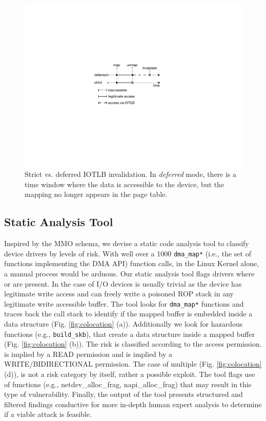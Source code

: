 \begin{figure}[t]
    \centering
    \includegraphics[width=1\columnwidth]{figs/strict.pdf}
    \caption{Strict vs. deferred IOTLB invalidation. In \emph{deferred} mode, there is a time window where the data is accessible to the device, but the mapping no longer appears in the page table.}
    \label{fig:deferred}
\end{figure}
\subsection{Static Analysis Tool}

Inspired by the MMO schema, we devise a static code analysis tool to classify device drivers by levels of risk. With well over a 1000 \texttt{dma\_map*} (i.e., the set of functions implementing the DMA API) function calls, in the Linux Kernel alone, a manual process would be arduous.
Our static analysis tool flags drivers where \means{} or \oportunity{} are present. In the case of I/O devices \motivation{} is usually trivial as the device has legitimate write access and can freely write a poisoned ROP stack in any legitimate write accessible buffer. The tool looks for \texttt{dma\_map*} functions and traces back the call stack to identify if the mapped buffer is embedded inside a data structure (Fig. \ref{fig:colocation} (a)). Additionally we look for hazardous functions (e.g., \texttt{build\_skb}), that create a data structure inside a mapped buffer (Fig. \ref{fig:colocation} (b)). The risk is classified according to the access permission. \means{} is implied by a READ permission and \oportunity{} is implied by a WRITE/BIDIRECTIONAL permission. The case of multiple \iova{} (Fig. \ref{fig:colocation} (d)), is not a risk category by itself, rather a possible exploit. The tool flags use of functions (e.g., netdev\_alloc\_frag, napi\_alloc\_frag) that may result in this type of vulnerability.
Finally, the output of the tool presents structured and filtered findings conductive for more in-depth human expert analysis to determine if a viable attack is feasible. 

